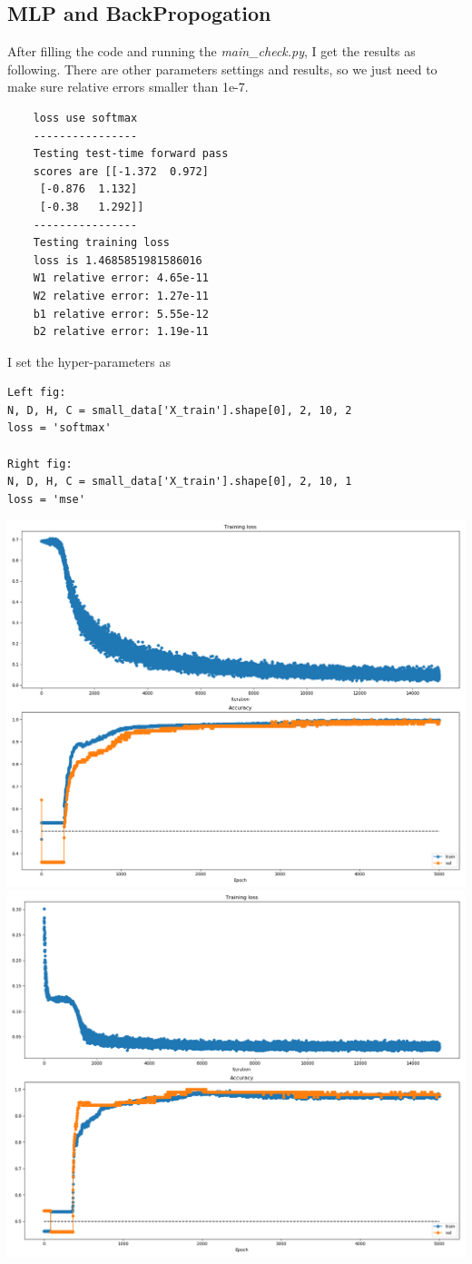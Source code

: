 \documentclass[12pt]{article}
\begin{document}
\subsection{MLP and BackPropogation} 

After filling the code and running the \textit{main\_check.py}, I get the results as following. There are other parameters settings and results, so we just need to make sure relative errors smaller than 1e-7. 

\begin{verbatim}
	loss use softmax
	----------------
	Testing test-time forward pass
	scores are [[-1.372  0.972]
	 [-0.876  1.132]
	 [-0.38   1.292]]
	----------------
	Testing training loss
	loss is 1.4685851981586016
	W1 relative error: 4.65e-11
	W2 relative error: 1.27e-11
	b1 relative error: 5.55e-12
	b2 relative error: 1.19e-11	
\end{verbatim}
I set the hyper-parameters as
\begin{verbatim}
Left fig: 
N, D, H, C = small_data['X_train'].shape[0], 2, 10, 2
loss = 'softmax'

Right fig:
N, D, H, C = small_data['X_train'].shape[0], 2, 10, 1
loss = 'mse'
\end{verbatim}

\begin{center}
	\includegraphics[width=.49\textwidth]{fig/2018-04-02-15-16-43.png}
	\includegraphics[width=.49\textwidth]{fig/2018-04-02-15-15-07.png} 
\end{center}
\end{document}
